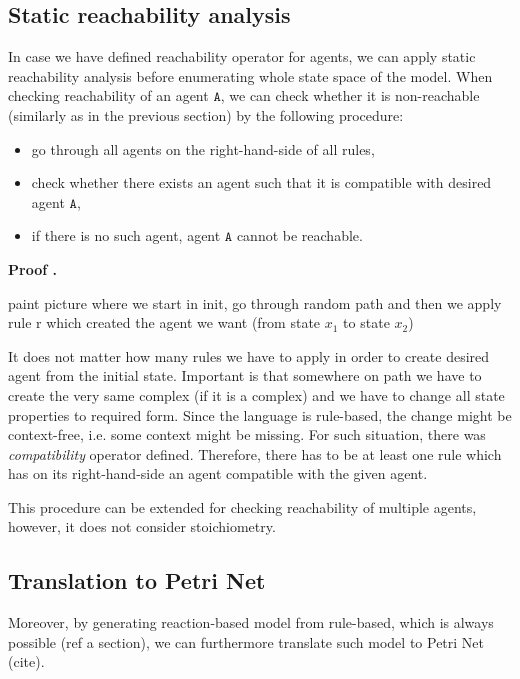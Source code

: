 \documentclass[12pt]{fithesis2}
\newcounter{counter}[section]
\renewcommand{\thecounter}{\thesection.\arabic{counter}}
\newenvironment{proof}{\bigskip\refstepcounter{counter}\noindent\textbf{Proof \thecounter}\par\nopagebreak}{\bigskip}
\begin{document}
\subsection{Static reachability analysis}

In case we have defined reachability operator for agents, we can apply static reachability analysis before enumerating whole state space of the model. When checking reachability of an agent $\mathtt{A}$, we can check whether it is non-reachable (similarly as in the previous section) by the following procedure:

\begin{itemize}
\item go through all agents on the right-hand-side of all rules,
\item check whether there exists an agent such that it is compatible with desired agent $\mathtt{A}$,
\item if there is no such agent, agent $\mathtt{A}$ cannot be reachable.
\end{itemize}

\begin{proof}
{paint picture where we start in init, go through random path and then we apply rule r which created the agent we want (from state $x_1$ to state $x_2$)

It does not matter how many rules we have to apply in order to create desired agent from the initial state. Important is that somewhere on path we have to create the very same complex (if it is a complex) and we have to change all state properties to required form. Since the language is rule-based, the change might be context-free, i.e. some context might be missing. For such situation, there was \emph{compatibility} operator defined. Therefore, there has to be at least one rule which has on its right-hand-side an agent compatible with the given agent.}
\end{proof}

This procedure can be extended for checking reachability of multiple agents, however, it does not consider stoichiometry.

\subsection{Translation to Petri Net}

Moreover, by generating reaction-based model from rule-based, which is always possible (ref a section), we can furthermore translate such model to Petri Net (cite).
\end{document}

